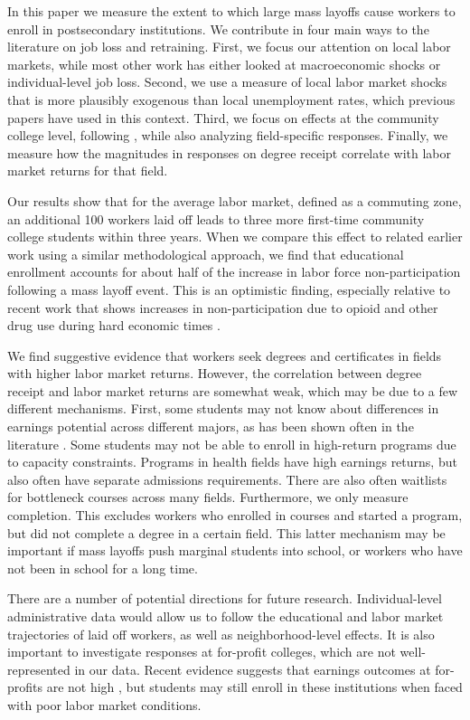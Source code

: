
In this paper we measure the extent to which large mass layoffs cause workers to enroll in postsecondary institutions. We contribute in four main ways to the literature on job loss and retraining. First, we focus our attention on local labor markets, while most other work has either looked at macroeconomic shocks or individual-level job loss. Second, we use a measure of local labor market shocks that is more plausibly exogenous than local unemployment rates, which previous papers have used in this context. Third, we focus on effects at the community college level, following \citet{BF1995}, while also analyzing field-specific responses. Finally, we measure how the magnitudes in responses on degree receipt correlate with labor market returns for that field.

Our results show that for the average labor market, defined as a commuting zone, an additional 100 workers laid off leads to three more first-time community college students within three years. When we compare this effect to related earlier work using a similar methodological approach, we find that educational enrollment accounts for about half of the increase in labor force non-participation following a mass layoff event. This is an optimistic finding, especially relative to recent work that shows increases in non-participation due to opioid and other drug use during hard economic times \citep{HRS2017}.

We find suggestive evidence that workers seek degrees and certificates in fields with higher labor market returns. However, the correlation between degree receipt and labor market returns are somewhat weak, which may be due to a few different mechanisms. First, some students may not know about differences in earnings potential across different majors, as has been shown often in the literature \citep{wiswall2015determinants, bakereffect}. Some students may not be able to enroll in high-return programs due to capacity constraints. Programs in health fields have high earnings returns, but also often have separate admissions requirements. There are also often waitlists for bottleneck courses across many fields. Furthermore, we only measure completion. This excludes workers who enrolled in courses and started a program, but did not complete a degree in a certain field. This latter mechanism may be important if mass layoffs push marginal students into school, or workers who have not been in school for a long time.
 
There are a number of potential directions for future research. Individual-level administrative data would allow us to follow the educational and labor market trajectories of laid off workers, as well as neighborhood-level effects. It is also important to investigate responses at for-profit colleges, which are not well-represented in our data. Recent evidence suggests that earnings outcomes at for-profits are not high \citep{DKMWP2016, DYAGK2016, CT2016, CN2015}, but students may still enroll in these institutions when faced with poor labor market conditions.

